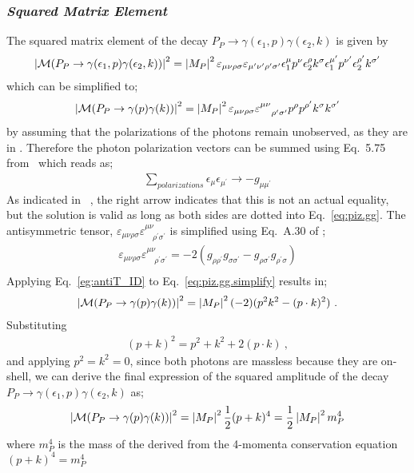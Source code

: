 \subsubsection{\emph{Squared Matrix Element}}
The squared matrix element of the decay $P_P \to \gamma(\epsilon_1,p) \gamma(\epsilon_2,k)$ is given by
\begin{align}\label{eq:piz.gg}
\left|{\cal  M}(P_{P}\rightarrow\gamma(\epsilon_{1},p)\gamma(\epsilon_{2},k))\right|^{2}=\left|M_{P}\right|^{2}\varepsilon_{\mu\nu\rho\sigma}\varepsilon_{\mu^{\prime}\nu^{\prime}\rho^{\prime}\sigma^{\prime}}\epsilon_{1}^{\mu}p^{\nu}\epsilon_{2}^{\rho}k^{\sigma}\epsilon_{1}^{\mu^{\prime}}p^{\nu^{\prime}}\epsilon_{2}^{\rho^{\prime}}k^{\sigma^{\prime}}
%
\end{align}
which can be simplified to;
\begin{align}\label{eq:piz.gg.simplify}
\left|{\cal M}(P_{P}\to\gamma(p)\gamma(k))\right|^{2}=\left|M_{P}\right|^{2}\varepsilon_{\mu\nu\rho\sigma}\varepsilon^{\mu\nu}_{\quad \rho^{\prime}\sigma^{\prime}}p^{\rho}p^{\rho^{\prime}}k^{\sigma}k^{\sigma^{\prime}}
%
\end{align}
by assuming that the polarizations of the photons remain unobserved, as they are in . Therefore the photon polarization vectors can be summed using Eq.~5.75 from~\cite{peskin} which reads as;
\begin{align}
\sum\limits_{polarizations} \epsilon_{\mu} \epsilon_{\mu^{\prime}} \to -g_{\mu\mu^{\prime}} 
\end{align}
As indicated in ~\cite{peskin}, the right arrow indicates that this is not an actual equality, but the solution is valid as long as both sides are dotted into Eq.~\ref{eq:piz.gg}. The antisymmetric tensor, $\varepsilon_{\mu\nu\rho\sigma}\varepsilon^{\mu\nu}_{\quad \rho^{\prime}\sigma^{\prime}}$ is simplified using  Eq.~A.30 of \cite{peskin}; 
\begin{align}\label{eg:antiT_ID}
\varepsilon_{\mu\nu\rho\sigma}\varepsilon^{\mu\nu}_{\quad \rho^{\prime}\sigma^{\prime}} = -2(g_{\rho\rho^{\prime}}g_{\sigma\sigma^{\prime}} - g_{\rho\sigma^{\prime}}g_{\rho^{\prime}\sigma})\\
\end{align}
Applying Eq.~\ref{eg:antiT_ID} to Eq.~\ref{eq:piz.gg.simplify} results in;
\begin{align}\label{eq:piz.gg.reduced}
\left|{\cal M}(P_{P}\to\gamma(p)\gamma(k))\right|^{2}=\left|M_{P}\right|^{2}(-2)(p^2k^2 - (p\cdot k)^2) \ .
%
\end{align}
Substituting
\begin{align}
(p + k)^2 = p^2 + k^2 +2 (p\cdot k) \ ,
\end{align}
and applying $p^2= k^2=0$, since both photons are massless because they are on-shell, we can derive the final expression of the squared amplitude of the decay $P_P \to \gamma(\epsilon_1,p) \gamma(\epsilon_2,k)$ as;
\begin{align}\label{eq:piz_gg_amp_final}
\left|{\cal M}(P_{P}\to\gamma(p)\gamma(k))\right|^{2}= \left|M_{P}\right|^{2}\frac{1}{2}(p+k)^{4} = \frac{1}{2}\left|M_{P}\right|^{2}m_{P}^{4}
\end{align}
where $m_P^4$ is the mass of the \etaTP derived from the 4-momenta conservation equation $(p+k)^4 = m_P^4$
